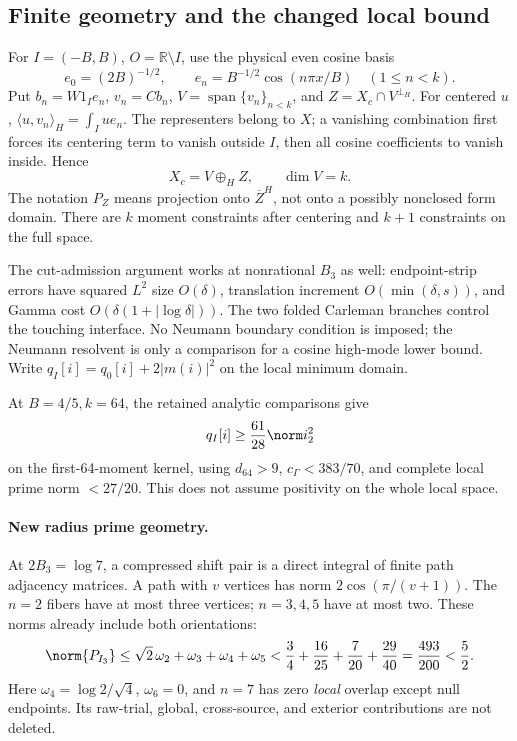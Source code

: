 \documentclass[11pt,a4paper]{article}
\numberwithin{equation}{section}
\theoremstyle{definition}\newtheorem{definition}[theorem]{Definition}
\theoremstyle{remark}\newtheorem{remark}[theorem]{Remark}
\newcommand{\rhip}[2]{\langle#1,#2\rangle_H}
\newcommand{\R}{\mathbb R}\newcommand{\C}{\mathbb C}\newcommand{\N}{\mathbb N}
\begin{document}
\subsection{Finite geometry and the changed local bound}\label{vrg:sec:geometry}
For \(I=(-B,B)\), \(O=\R\setminus I\), use the physical even cosine basis
\[
e_0=(2B)^{-1/2},\qquad e_n=B^{-1/2}\cos(n\pi x/B)\quad(1\leq n<k).
\]
Put \(b_n=W1_Ie_n\), \(v_n=Cb_n\),
\(V=\operatorname{span}\{v_n\}_{n<k}\), and \(Z=X_c\cap V^{\perp_H}\).
For centered \(u\), \(\rhip u{v_n}=\int_Iu e_n\).
The representers belong to \(X\); a vanishing combination first forces its
centering term to vanish outside \(I\), then all cosine coefficients to
vanish inside. Hence
\[
X_c=V\mathbin{\oplus_H}Z,\qquad \dim V=k.
\]
The notation \(P_Z\) means projection onto \(\overline{Z}^{H}\), not onto a
possibly nonclosed form domain. There are \(k\) moment constraints after
centering and \(k+1\) constraints on the full space.

The cut-admission argument works at nonrational \(B_3\) as well:
endpoint-strip errors have squared \(L^2\) size \(O(\delta)\),
translation increment \(O(\min(\delta,s))\), and Gamma cost
\(O(\delta(1+|\log\delta|))\). The two folded Carleman branches control the
touching interface. No Neumann boundary condition is imposed; the Neumann
resolvent is only a comparison for a cosine high-mode lower bound.
Write \(q_I[i]=q_0[i]+2|m(i)|^2\) on the local minimum domain.

At \(B=4/5,k=64\), the retained analytic comparisons give
\[
q_I[i]\geq\frac{61}{28}\norm i_2^2
\]
on the first-64-moment kernel, using
\(d_{64}>9\), \(c_\Gamma<383/70\), and complete local prime norm \(<27/20\).
This does not assume positivity on the whole local space.

\paragraph{New radius prime geometry.}
At \(2B_3=\log7\), a compressed shift pair is a direct integral of finite
path adjacency matrices. A path with \(v\) vertices has norm
\(2\cos(\pi/(v+1))\). The \(n=2\) fibers have at most three vertices;
\(n=3,4,5\) have at most two. These norms already include both orientations:
\[
\norm{P_{I_3}}\leq\sqrt2\,\omega_2+\omega_3+\omega_4+\omega_5
 <\frac34+\frac{16}{25}+\frac7{20}+\frac{29}{40}
 =\frac{493}{200}<\frac52.
\]
Here \(\omega_4=\log2/\sqrt4\), \(\omega_6=0\), and \(n=7\) has zero
\emph{local} overlap except null endpoints. Its raw-trial, global,
cross-source, and exterior contributions are not deleted.
\end{document}
